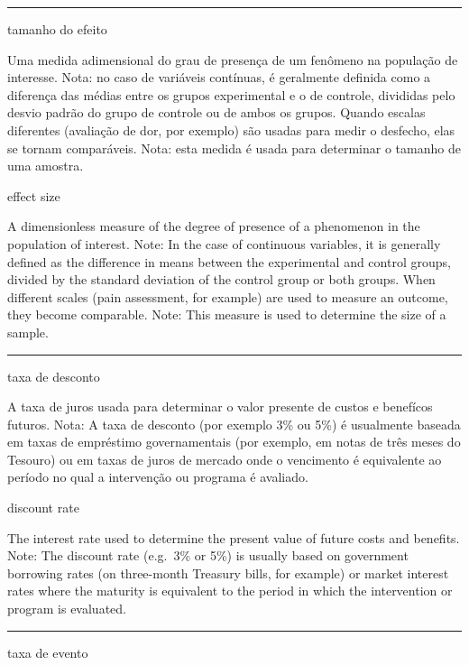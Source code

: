 \documentclass[
  openany]{book}
\begin{document}
\begin{center}\rule{0.5\linewidth}{0.5pt}\end{center}

tamanho do efeito

Uma medida adimensional do grau de presença de um fenômeno na população de interesse. Nota: no caso de variáveis contínuas, é geralmente definida como a diferença das médias entre os grupos experimental e o de controle, divididas pelo desvio padrão do grupo de controle ou de ambos os grupos. Quando escalas diferentes (avaliação de dor, por exemplo) são usadas para medir o desfecho, elas se tornam comparáveis. Nota: esta medida é usada para determinar o tamanho de uma amostra.

effect size

A dimensionless measure of the degree of presence of a phenomenon in the population of interest. Note: In the case of continuous variables, it is generally defined as the difference in means between the experimental and control groups, divided by the standard deviation of the control group or both groups. When different scales (pain assessment, for example) are used to measure an outcome, they become comparable. Note: This measure is used to determine the size of a sample.

\begin{center}\rule{0.5\linewidth}{0.5pt}\end{center}

taxa de desconto

A taxa de juros usada para determinar o valor presente de custos e benefícos futuros. Nota: A taxa de desconto (por exemplo 3\% ou 5\%) é usualmente baseada em taxas de empréstimo governamentais (por exemplo, em notas de três meses do Tesouro) ou em taxas de juros de mercado onde o vencimento é equivalente ao período no qual a intervenção ou programa é avaliado.

discount rate

The interest rate used to determine the present value of future costs and benefits. Note: The discount rate (e.g.~3\% or 5\%) is usually based on government borrowing rates (on three-month Treasury bills, for example) or market interest rates where the maturity is equivalent to the period in which the intervention or program is evaluated.

\begin{center}\rule{0.5\linewidth}{0.5pt}\end{center}

taxa de evento
\end{document}
